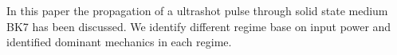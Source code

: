 \documentclass[../main.tex]{subfiles}
\begin{document}
	In this paper the propagation of a ultrashot pulse through solid state
	medium BK7 has been discussed. We identify different regime base on
	input power and identified dominant mechanics in each
	regime.
\end{document}
